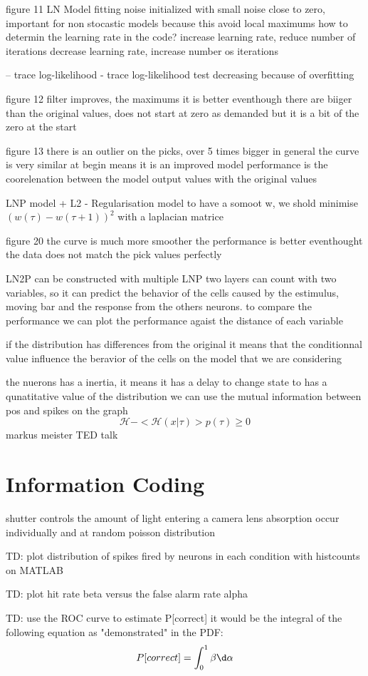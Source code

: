 \documentclass{article}
\begin{document}
figure 11
LN Model fitting
noise initialized with small noise close to zero, important for non stocastic models because this avoid local maximums
how to determin the learning rate in the code?
increase learning rate, reduce number of iterations
decrease learning rate, increase number os iterations

-- trace log-likelihood
- trace log-likelihood test decreasing because of overfitting

figure 12
filter
improves, the maximums it is better eventhough there are biiger than the original values, does not start at zero as demanded but it is a bit of the zero at the start

figure 13
there is an outlier on the picks, over 5 times bigger
in general the curve is very similar at begin means it is an improved model
performance is the coorelenation between the model output values with the original values



LNP model + L2 - Regularisation model
to have a somoot w, we shold minimise $(w(\tau) - w(\tau + 1))^2$
with a laplacian matrice 

figure 20
the curve is much more smoother
the performance is better eventhought the data does not match the pick values perfectly

LN2P can be constructed with multiple LNP
two layers can count with two variables, so it can predict the behavior of the cells caused by the estimulus, moving bar and the response from the others neurons. to compare the performance we can plot the performance agaist the distance of each variable

if the distribution has differences from the original it means that the conditionnal value influence the beravior of the cells on the model that we are considering

the nuerons has a inertia, it means it has a delay to change state
to has a qunatitative value of the distribution we can use the mutual information between pos and spikes on the graph
\begin{equation}
    \mathcal{H} - <\mathcal{H}(x|\tau)> p(\tau) \geq 0
\end{equation}
markus meister TED talk

\section{Information Coding}
shutter controls the amount of light entering a camera lens
absorption occur individually and at random poisson distribution

TD: plot distribution of spikes fired by neurons in each condition with histcounts on MATLAB

TD: plot hit rate beta versus the false alarm rate alpha

TD: use the ROC curve to estimate P[correct]
it would be the integral of the following equation as "demonstrated" in the PDF:
\begin{equation}
    P[correct] = \int_{0}^{1} \beta \d\alpha
\end{equation}
\end{document}
